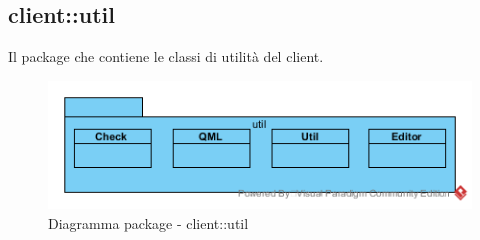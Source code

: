 \vspace{0.5cm}
\subsection{client::util}
Il package che contiene le classi di utilità del client.\begin{center}
	\begin{figure}[H]
		\centering \includegraphics[scale=4, max width=\textwidth, max height=\myheight]{../img/diagrammiClassi/client/util.png}
		\caption{Diagramma package - client::util}
	\end{figure}
\end{center}\hypertarget{client::util::Check}{}
